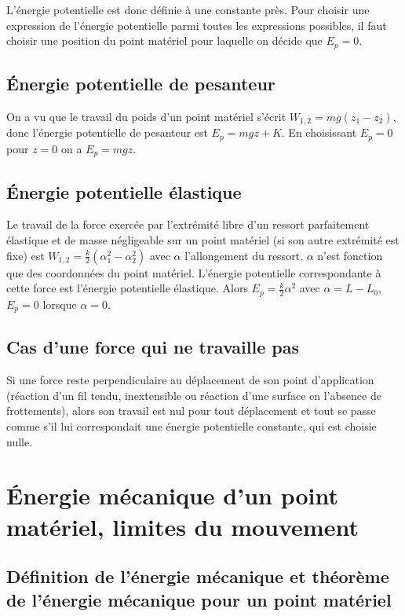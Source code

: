 L'énergie potentielle est donc définie à une constante près. Pour choisir une expression de l'énergie potentielle parmi toutes les expressions possibles, il faut choisir une position du point matériel pour laquelle on décide que $E_p=0$.

\subsection{Énergie potentielle de pesanteur}
\label{chap4-subsec:NRJPotPes}

On a vu que le travail du poids d'un point matériel s'écrit $W_{1, 2}=mg(z_1-z_2)$, donc l'énergie potentielle de pesanteur est $E_p = mgz +K$. En choisissant $E_p=0$ pour $z=0$ on a $E_p=mgz$.

\subsection{Énergie potentielle élastique}
\label{chap4-subsec:NRJPotElast}

Le travail de la force exercée par l'extrémité libre d'un ressort parfaitement élastique et de masse négligeable sur un point matériel (si son autre extrémité est fixe) est $W_{1, 2} = \frac{k}{2}(\alpha_1^2-\alpha_2^2)$ avec $\alpha$ l'allongement du ressort. $\alpha$ n'est fonction que des coordonnées du point matériel. L'énergie potentielle correspondante à cette force est l'énergie potentielle élastique. Alors $E_p = \frac{k}{2}\alpha^2$ avec $\alpha=L-L_0$, $E_p=0$ lorsque $\alpha=0$.

\subsection{Cas d'une force qui ne travaille pas}
\label{chap4-subsec:casduneforcequinetravaillepas}

Si une force reste perpendiculaire au déplacement de son point d'application (réaction d'un fil tendu, inextensible ou réaction d'une surface en l'absence de frottements), alors son travail est nul pour tout déplacement et tout se passe comme s'il lui correspondait une énergie potentielle constante, qui est choisie nulle.

\section{Énergie mécanique d'un point matériel, limites du mouvement}
\label{chap4-sec:NRJmecanique}

\subsection{Définition de l'énergie mécanique et théorème de l'énergie mécanique pour un point matériel}
\label{chap4-subsec:Defdelenergiemecanique}

